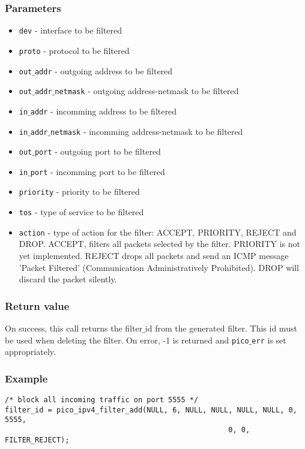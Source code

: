\subsubsection*{Parameters}
\begin{itemize}[noitemsep]
\item \texttt{dev} - interface to be filtered
\item \texttt{proto} - protocol to be filtered
\item \texttt{out$\_$addr} - outgoing address to be filtered
\item \texttt{out$\_$addr$\_$netmask} - outgoing address-netmask to be filtered
\item \texttt{in$\_$addr} - incomming address to be filtered
\item \texttt{in$\_$addr$\_$netmask} - incomming address-netmask to be filtered
\item \texttt{out$\_$port} - outgoing port to be filtered
\item \texttt{in$\_$port} - incomming port to be filtered
\item \texttt{priority} - priority to be filtered
\item \texttt{tos} - type of service to be filtered
\item \texttt{action} - type of action for the filter: ACCEPT, PRIORITY, REJECT and DROP. ACCEPT, filters all packets selected by the filter. PRIORITY is not yet implemented. REJECT drops all packets and send an ICMP message 'Packet Filtered' (Communication Administratively Prohibited). DROP will discard the packet silently.
\end{itemize}

\subsubsection*{Return value}
On success, this call returns the filter$\_$id from the generated filter. This id must be used when deleting the filter.
On error, -1 is returned and \texttt{pico$\_$err} is set appropriately.

\subsubsection*{Example}
\begin{verbatim}
/* block all incoming traffic on port 5555 */
filter_id = pico_ipv4_filter_add(NULL, 6, NULL, NULL, NULL, NULL, 0, 5555,
													0, 0, FILTER_REJECT);
\end{verbatim}

